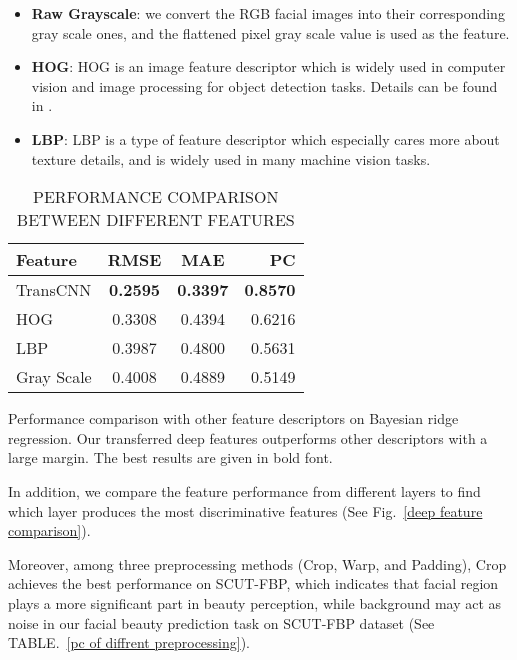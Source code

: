 \documentclass[a4paper,conference]{IEEEtran}
\begin{document}
  \begin{itemize}
    \item \textbf{Raw Grayscale}: we convert the RGB facial images into their
          corresponding gray scale ones, and the flattened pixel gray scale
          value is used as the feature.
    \item \textbf{HOG}: HOG is an image feature descriptor which is widely used
          in computer vision and image processing for object detection tasks.
          Details can be found in \cite{dalal2005histograms}.
    \item \textbf{LBP}: LBP is a type of feature descriptor which especially
          cares more about texture details, and is widely used in many machine
          vision tasks.
  \end{itemize}

  \begin{table}
    \caption{PERFORMANCE COMPARISON BETWEEN DIFFERENT FEATURES}
    \label{different features performance comparison}
    \begin{center}
      \begin{tabular}{l|ccr}
        \hline
        \textbf{Feature} & \textbf{RMSE} & \textbf{MAE} & \textbf{PC} \\ \hline\hline
        TransCNN & {\textbf{0.2595}} & {\textbf{0.3397}} & {\textbf{0.8570}} \\
        HOG & 0.3308 & 0.4394 & 0.6216 \\
        LBP & 0.3987 & 0.4800  & 0.5631  \\
        Gray Scale & 0.4008 & 0.4889 & 0.5149 \\ \hline
      \end{tabular}
      \begin{tablenotes}
        \footnotesize
        Performance comparison with other feature descriptors on Bayesian ridge
        regression. Our transferred deep features outperforms other descriptors
        with a large margin. The best results are given in bold font.
      \end{tablenotes}
    \end{center}
  \end{table}


  In addition, we compare the feature performance from different layers to find
  which layer produces the most discriminative features (See Fig.~\ref{deep feature comparison}).

  Moreover, among three preprocessing methods (Crop, Warp, and Padding),
  Crop achieves the best performance on SCUT-FBP, which indicates that facial
  region plays a more significant part in beauty perception, while background may
  act as noise in our facial beauty prediction task on SCUT-FBP dataset
  (See TABLE.~\ref{pc of diffrent preprocessing}).
\end{document}
